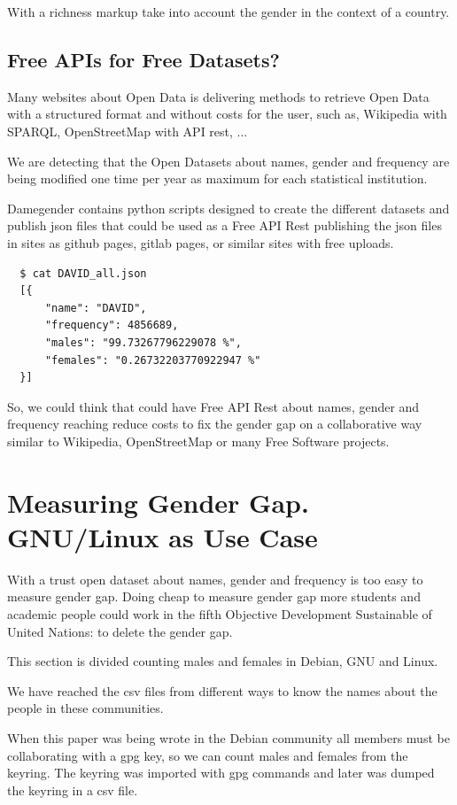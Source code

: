 \documentclass[a4paper]{article}
\begin{document}
With a richness markup take into account the gender in the context of
a country.

\subsection{Free APIs for Free Datasets?}
\label{sec:freeapis}

Many websites about Open Data is delivering methods to retrieve Open
Data with a structured format and without costs for the user, such as,
Wikipedia with SPARQL, OpenStreetMap with API rest, ...

We are detecting that the Open Datasets about names, gender and
frequency are being modified one time per year as maximum for each
statistical institution.

Damegender contains python scripts designed to create the
different datasets and publish json files that could be used as a Free
API Rest publishing the json files in sites as github pages, gitlab
pages, or similar sites with free uploads.

\begin{verbatim}
  $ cat DAVID_all.json
  [{
      "name": "DAVID",
      "frequency": 4856689,
      "males": "99.73267796229078 %",
      "females": "0.26732203770922947 %"
  }]
\end{verbatim}

So, we could think that could have Free API Rest about names, gender
and frequency reaching reduce costs to fix the gender gap on a
collaborative way similar to Wikipedia, OpenStreetMap or many Free
Software projects.

\section{Measuring Gender Gap. GNU/Linux as Use Case}
\label{sec:measuring}

With a trust open dataset about names, gender and frequency is too
easy to measure gender gap. Doing cheap to measure gender gap more
students and academic people could work in the fifth Objective
Development Sustainable of United Nations: to delete the gender gap.

This section is divided counting males and females in Debian, GNU and
Linux.

We have reached the csv files from different ways to know the names
about the people in these communities.

When this paper was being wrote in the Debian community all members
must be collaborating with a gpg key, so we can count males and females
from the keyring. The keyring was imported with gpg commands and later
was dumped the keyring in a csv file.
\end{document}
